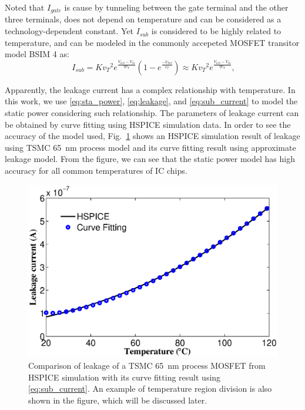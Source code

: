 Noted that $I_{gate}$ is cause by tunneling between the gate terminal and the other three terminals, does not depend on temperature and can be considered as a technology-dependent constant. Yet $I_{sub}$ is considered to be highly related to temperature, and can be modeled in the commonly accepeted MOSFET transitor model BSIM 4 as:
\begin{equation}\label{eq:sub_current}\
I_{sub}=K {v_T}^2e^{\frac{V_{GS}-V_{th}}{\eta v_T}}
  (1-e^{\frac{-V_{DS}}{v_T}}) \approx K {v_T}^2e^{\frac{V_{GS}-V_{th}}{\eta v_T}},
\end{equation}


Apparently, the leakage current has a complex relationship with
temperature. In this work, we use \eqref{eq:sta_power},
\eqref{eq:leakage}, and \eqref{eq:sub_current} to model the static
power considering such relationship. The parameters of
leakage current can be obtained by curve fitting using HSPICE simulation
data. In order to see the accuracy of the model used,
Fig.~\ref{fig:leakage} shows an HSPICE simulation result of leakage using TSMC \SI{65}{nm} process model and its curve fitting result using approximate
leakage model. From the figure, we can see that the static power model
has high accuracy for all common temperatures of IC chips.

\begin{figure}%
  \centering
  \includegraphics[width=1\columnwidth]{fig/leakage.eps}
  \caption{Comparison of leakage of a TSMC \SI{65}{nm} process MOSFET from HSPICE
    simulation with its curve fitting result using \eqref{eq:sub_current}. An example of
    temperature region division is also shown in the figure, which will be discussed later.}
  \label{fig:leakage}
\end{figure}


